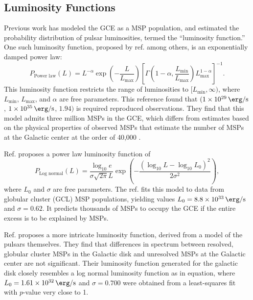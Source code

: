 \documentclass[a4paper,11pt]{article}
\newcommand{\parens}[1]{\left(#1\right)}
\newcommand{\brackets}[1]{\left[#1\right]}
\newcommand{\expp}[1]{\exp \parens{#1}}
\newcommand{\comment}[1]{\emph{\color{red}{#1}}}
\begin{document}
\subsection{Luminosity Functions}
\label{sec:lum-funcs}
Previous work has modeled the GCE as a MSP population, and estimated the probability distribution of pulsar luminosities, termed the ``luminosity function.'' One such luminosity function, proposed by ref. \cite{Zhong:2019ycb} among others, is an exponentially damped power law:
\begin{equation}
    P_\text{Power law}(L) = L^{-\alpha} \expp{-\frac{L}{L_\text{max}}}\brackets{\Gamma\parens{1-\alpha, \frac{L_\text{min}}{L_\text{max}}}L_\text{max}^{1-\alpha}}^{-1}.
    \label{eqn:power-law}
\end{equation}
This luminosity function restricts the range of luminosities to $[L_\text{min}, \infty)$, where $L_\text{min}$, $L_\text{max}$, and $\alpha$ are free parameters. \comment{The following should probably be moved to the introduction once I write it, where Fermilab's research is described.} This reference found that $(\SI{1e29}{\erg\per\second}$, $ \SI{1e35}{\erg\per\second}$, $1.94)$ is required reproduced observations. They find that this model admits three million MSPs in the GCE, which differs from estimates based on the physical properties of observed MSPs that estimate the number of MSPs at the Galactic center at the order of 40,000 \cite{citation_needed}.

Ref. \cite{osti_1305131} proposes a power law luminosity function of
\begin{equation}
    P_\text{Log normal}(L)= \frac{\log_{10} e}{\sigma \sqrt{2\pi} L}\expp{-\frac{\parens{\log_{10} L - \log_{10} L_0}^2}{2\sigma^2}},
    \label{eqn:log-normal}
\end{equation}
where $L_0$ and $\sigma$ are free parameters. The ref. fits this model to data from globular cluster (GCL) MSP populations, yielding values $L_0 = \SI{8.8e33}{\erg\per\second}$ and $\sigma=0.62$. It predicts thousands of MSPs to occupy the GCE if the entire excess is to be explained by MSPs.

Ref. \cite{Ploeg:2020jeh} proposes a more intricate luminosity function, derived from a model of the pulsars themselves. They find that differences in spectrum between resolved, globular cluster MSPs in the Galactic disk and unresolved MSPs at the Galactic center are not significant. Their luminosity function generated for the galactic disk closely resembles a log normal luminosity function as in equation, where $L_0 = \SI{1.61e+32}{\erg\per\second}$ and $\sigma=0.700$ were obtained from a least-squares fit with $p$-value very close to 1\comment{Is there something wrong with the error bars here?}.
\end{document}
